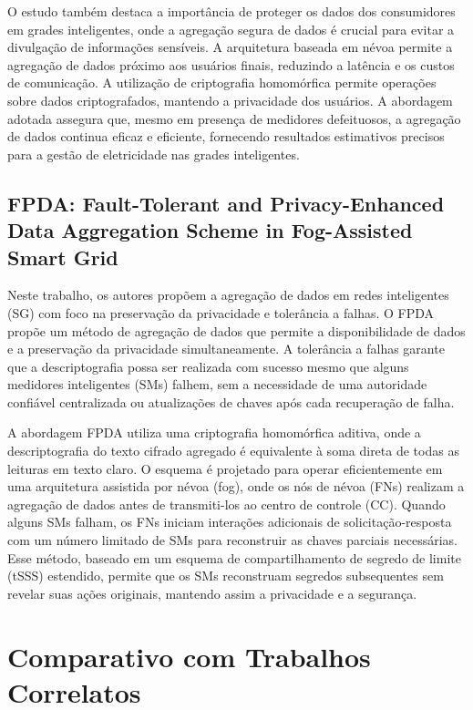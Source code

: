O estudo também destaca a importância de proteger os dados dos consumidores em grades inteligentes, onde a agregação segura de dados é crucial para evitar a divulgação de informações sensíveis. A arquitetura baseada em névoa permite a agregação de dados próximo aos usuários finais, reduzindo a latência e os custos de comunicação. A utilização de criptografia homomórfica permite operações sobre dados criptografados, mantendo a privacidade dos usuários. A abordagem adotada assegura que, mesmo em presença de medidores defeituosos, a agregação de dados continua eficaz e eficiente, fornecendo resultados estimativos precisos para a gestão de eletricidade nas grades inteligentes.

\subsection{FPDA: Fault-Tolerant and Privacy-Enhanced Data Aggregation Scheme in Fog-Assisted Smart Grid}

Neste trabalho, os autores propõem a agregação de dados em redes inteligentes (SG) com foco na preservação da privacidade e tolerância a falhas. O FPDA propõe um método de agregação de dados que permite a disponibilidade de dados e a preservação da privacidade simultaneamente. A tolerância a falhas garante que a descriptografia possa ser realizada com sucesso mesmo que alguns medidores inteligentes (SMs) falhem, sem a necessidade de uma autoridade confiável centralizada ou atualizações de chaves após cada recuperação de falha.

A abordagem FPDA utiliza uma criptografia homomórfica aditiva, onde a descriptografia do texto cifrado agregado é equivalente à soma direta de todas as leituras em texto claro. O esquema é projetado para operar eficientemente em uma arquitetura assistida por névoa (fog), onde os nós de névoa (FNs) realizam a agregação de dados antes de transmiti-los ao centro de controle (CC). Quando alguns SMs falham, os FNs iniciam interações adicionais de solicitação-resposta com um número limitado de SMs para reconstruir as chaves parciais necessárias. Esse método, baseado em um esquema de compartilhamento de segredo de limite (tSSS) estendido, permite que os SMs reconstruam segredos subsequentes sem revelar suas ações originais, mantendo assim a privacidade e a segurança.

\section{Comparativo com Trabalhos Correlatos}


